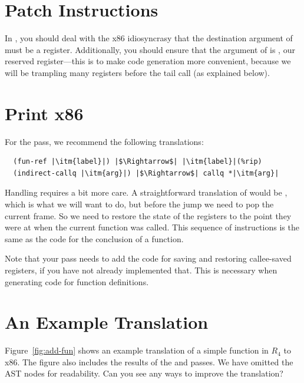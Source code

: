\documentclass[11pt]{book}
\begin{document}
\section{Patch Instructions}

In , you should deal with the x86
idiosyncrasy that the destination argument of  must be a
register. Additionally, you should ensure that the argument of
 is , our reserved register---this is to make
code generation more convenient, because we will be trampling many
registers before the tail call (as explained below).

\section{Print x86}

For the  pass, we recommend the following translations:
\begin{lstlisting}
  (fun-ref |\itm{label}|) |$\Rightarrow$| |\itm{label}|(%rip)
  (indirect-callq |\itm{arg}|) |$\Rightarrow$| callq *|\itm{arg}|
\end{lstlisting}
Handling  requires a bit more care. A straightforward
translation of  would be , which
is what we will want to do, but before the jump we need to pop the
current frame. So we need to restore the state of the registers to the
point they were at when the current function was called.  This
sequence of instructions is the same as the code for the conclusion of
a function.

Note that your  pass needs to add the code for saving
and restoring callee-saved registers, if you have not already
implemented that. This is necessary when generating code for function
definitions.

\section{An Example Translation}

Figure~\ref{fig:add-fun} shows an example translation of a simple
function in $R_4$ to x86. The figure also includes the results of the
 and  passes.  We
have omitted the  AST nodes for readability.  Can you
see any ways to improve the translation?
\end{document}
